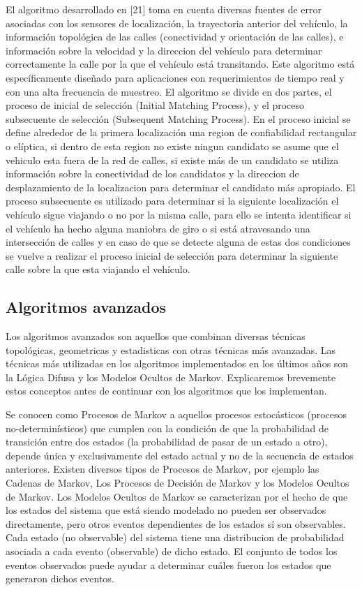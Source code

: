 El algoritmo desarrollado en [21] toma en cuenta diversas fuentes de error asociadas con los sensores de localización, la trayectoria anterior del vehículo, la información topológica de las calles (conectividad y orientación de las calles), e información sobre la velocidad y la direccion del vehículo para determinar correctamente la calle por la que el vehículo está transitando. Este algoritmo está específicamente diseñado para aplicaciones con requerimientos de tiempo real y con una alta frecuencia de muestreo. El algoritmo se divide en dos partes, el proceso de inicial de selección (Initial Matching Process), y el proceso subsecuente de selección (Subsequent Matching Process). En el proceso inicial se define alrededor de la primera localización una region de confiabilidad rectangular o elíptica, si dentro de esta region no existe ningun candidato se asume que el vehiculo esta fuera de la red de calles, si existe más de un candidato se utiliza información sobre la conectividad de los candidatos y la direccion de desplazamiento de la localizacion para determinar el candidato más apropiado. El proceso subsecuente es utilizado para determinar si la siguiente localización el vehículo sigue viajando o no por la misma calle, para ello se intenta identificar si el vehículo ha hecho alguna maniobra de giro o si está atravesando una intersección de calles y en caso de que se detecte alguna de estas dos condiciones se vuelve a realizar el proceso inicial de selección para determinar la siguiente calle sobre la que esta viajando el vehículo.

\subsection{Algoritmos avanzados}

Los algoritmos avanzados son aquellos que combinan diversas técnicas topológicas, geometricas y estadisticas con otras técnicas más avanzadas. Las técnicas más utilizadas en los algoritmos implementados en los últimos años son la Lógica Difusa y los Modelos Ocultos de Markov. Explicaremos brevemente estos conceptos antes de continuar con los algoritmos que los implementan.

Se conocen como Procesos de Markov a aquellos procesos estocásticos (procesos no-determinísticos) que cumplen con la condición de que la probabilidad de transición entre dos estados (la probabilidad de pasar de un estado a otro), depende única y exclusivamente del estado actual y no de la secuencia de estados anteriores. Existen diversos tipos de Procesos de Markov, por ejemplo las Cadenas de Markov, Los Procesos de Decisión de Markov y los Modelos Ocultos de Markov. Los Modelos Ocultos de Markov se caracterizan por el hecho de que los estados del sistema  que está siendo modelado no pueden ser observados directamente, pero otros eventos dependientes de los estados sí son observables. Cada estado (no observable) del sistema tiene una distribucion de probabilidad asociada a cada evento (observable) de dicho estado. El conjunto de todos los eventos observados puede ayudar a determinar cuáles fueron los estados que generaron dichos eventos.

